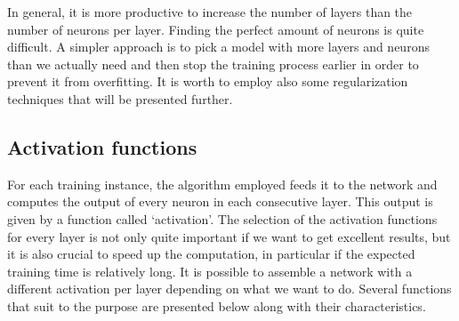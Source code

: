 In general, it is more productive to increase the number of layers than the number of neurons per layer. Finding the perfect amount of neurons is quite difficult. A simpler approach is to pick a model with more layers and neurons than we actually need and then stop the training process earlier in order to prevent it from overfitting. It is worth to employ also some regularization techniques that will be presented further.







\subsection{Activation functions}
For each training instance, the algorithm employed feeds it to the network and computes the output of every neuron in each consecutive layer. This output is given by a function called `activation'. The selection of the activation functions for every layer is not only quite important if we want to get excellent results, but it is also crucial to speed up the computation, in particular if the expected training time is relatively long. It is possible to assemble a network with a different activation per layer depending on what we want to do. Several functions that suit to the purpose are presented below along with their characteristics.

